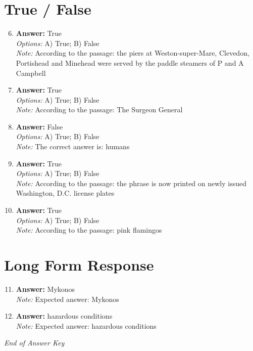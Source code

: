 \documentclass[12pt]{article}
\begin{document}
\section*{True / False}
\begin{enumerate}[label=\arabic*.]
\setcounter{enumi}{5}
\item \textbf{Answer:} True
\\ \textit{Options:} A) True; B) False
\\ \textit{Note:} According to the passage: the piers at Weston-super-Mare, Clevedon, Portishead and Minehead were served by the paddle steamers of P and A Campbell
\item \textbf{Answer:} True
\\ \textit{Options:} A) True; B) False
\\ \textit{Note:} According to the passage: The Surgeon General
\item \textbf{Answer:} False
\\ \textit{Options:} A) True; B) False
\\ \textit{Note:} The correct answer is: humans
\item \textbf{Answer:} True
\\ \textit{Options:} A) True; B) False
\\ \textit{Note:} According to the passage: the phrase is now printed on newly issued Washington, D.C. license plates
\item \textbf{Answer:} True
\\ \textit{Options:} A) True; B) False
\\ \textit{Note:} According to the passage: pink flamingos
\end{enumerate}

\section*{Long Form Response}
\begin{enumerate}[label=\arabic*.]
\setcounter{enumi}{10}
\item \textbf{Answer:} Mykonos
\\ \textit{Note:} Expected answer: Mykonos
\item \textbf{Answer:} hazardous conditions
\\ \textit{Note:} Expected answer: hazardous conditions
\end{enumerate}

\vfill
\noindent\textit{End of Answer Key}
\end{document}
